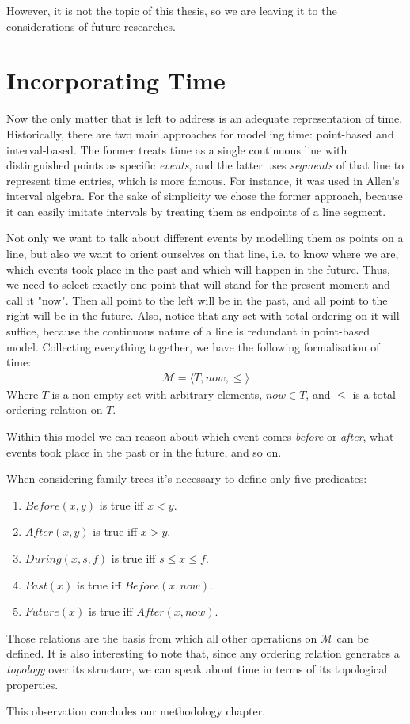     However, it is not the topic of this thesis, so we are leaving it to the considerations of future researches.

\section{Incorporating Time}
    Now the only matter that is left to address is an adequate representation of time. Historically, there are two main approaches
    for modelling time: point-based and interval-based. The former treats time as a single continuous line with distinguished points
    as specific \textit{events}, and the latter uses \textit{segments} of that line to represent time entries, which is more famous.
    For instance, it was used in Allen's interval algebra\cite{allen}. For the sake of simplicity we chose the former approach,
    because it can easily imitate intervals by treating them as endpoints of a line segment.

    Not only we want to talk about different events by modelling them as points on a line, but also we want to orient ourselves on
    that line, i.e. to know where we are, which events took place in the past and which will happen in the future. Thus, we need to
    select exactly one point that will stand for the present moment and call it "now". Then all point to the left will be in the past,
    and all point to the right will be in the future. Also, notice that any set with total ordering on it will suffice, because the
    continuous nature of a line is redundant in point-based model. Collecting everything together, we have the following formalisation
    of time:
    \begin{align*}
        \mathcal{M} = \langle T, now, \leqslant \rangle
    \end{align*}
    Where $T$ is a non-empty set with arbitrary elements, $now \in T$, and $\leqslant$ is a total ordering relation on $T$.

    Within this model we can reason about which event comes \textit{before} or \textit{after}, what events took place in the past or
    in the future, and so on.

    When considering family trees it's necessary to define only five predicates:
    \begin{enumerate}
        \item{$Before(x, y)$ is true iff $x < y$.}
        \item{$After(x, y)$ is true iff $x > y$.}
        \item{$During(x, s, f)$ is true iff $s \leqslant x \leqslant f$.}
        \item{$Past(x)$ is true iff $Before(x, now)$.}
        \item{$Future(x)$ is true iff $After(x, now)$.}
    \end{enumerate}
    Those relations are the basis from which all other operations on $\mathcal{M}$ can be defined. It is also interesting to note
    that, since any ordering relation generates a \textit{topology} over its structure, we can speak about time in terms of its
    topological properties.

    This observation concludes our methodology chapter.
